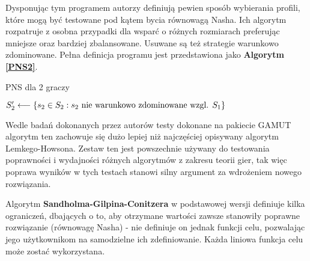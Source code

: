 \documentclass[polish]{standalone}
\begin{document}
Dysponując tym programem autorzy definiują pewien sposób wybierania profili, które mogą być testowane pod kątem bycia
równowagą Nasha. Ich algorytm rozpatruje z osobna przypadki dla wsparć o różnych rozmiarach preferując mniejsze oraz
bardziej zbalansowane. Usuwane są też strategie warunkowo zdominowane. Pełna definicja programu jest przedstawiona jako
\textbf{Algorytm \ref{PNS2}}.

\begin{algorithm}
\caption{PNS dla 2 graczy}
\label{PNS2}
\begin{algorithmic}
  \STATE $S_2' \longleftarrow \{ s_2 \in S_2: s_2 \textrm{ nie warunkowo zdominowane wzgl. } S_1 \}$
      \ENDIF
    \ENDIF
   \ENDFOR
  \ENDIF
 \ENDFOR
\ENDFOR
\end{algorithmic}
\end{algorithm}

Wedle badań dokonanych przez autorów testy dokonane na pakiecie GAMUT algorytm ten zachowuje się dużo lepiej niż
najczęściej opisywany algorytm Lemkego-Howsona. Zestaw ten jest powszechnie używany do testowania poprawności
i wydajności różnych algorytmów z zakresu teorii gier, tak więc poprawa wyników w tych testach stanowi silny argument
za wdrożeniem nowego rozwiązania.\cite{GAMUT}


Algorytm \textbf{Sandholma-Gilpina-Conitzera} w podstawowej wersji definiuje kilka ograniczeń, dbających o to, aby 
otrzymane wartości zawsze stanowiły poprawne rozwiązanie (równowagę Nasha) - nie definiuje on jednak funkcji celu,
pozwalając jego użytkownikom na samodzielne ich zdefiniowanie. Każda liniowa funkcja celu może zostać wykorzystana.
\end{document}
